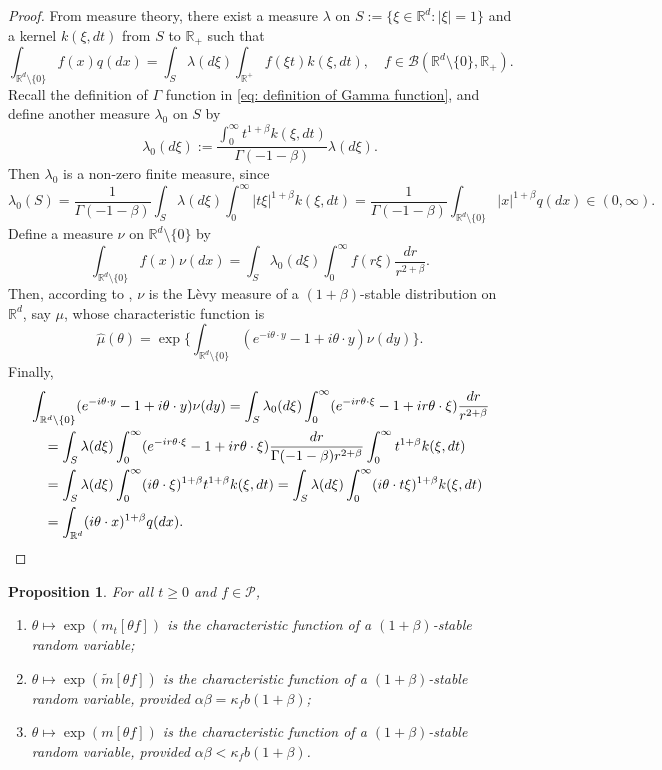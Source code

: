 \documentclass[12pt,a4paper]{amsart}
\theoremstyle{plain}
\newtheorem{prop}[thm]{Proposition}
\theoremstyle{definition}
\numberwithin{equation}{section}
\begin{document}
\begin{proof}
    From measure theory, there exist a measure $\lambda$ on $S:= \{\xi\in \mathbb R^d:|\xi| = 1\}$ and a kernel $k(\xi,dt)$ from $S$ to $\mathbb R_+$ such that
\[
    \int_{\mathbb R^d\setminus \{0\}} f(x)q(dx) = \int_S \lambda(d\xi) \int_{\mathbb R^+} f(\xi t)k(\xi,dt),\quad
    f\in \mathcal B(\mathbb R^d\setminus \{0\}, \mathbb R_+).
\]
Recall the definition of $\Gamma$ function in \eqref{eq: definition of Gamma function}, and define another measure $\lambda_0$ on $S$ by
\[
    \lambda_0(d\xi) := \frac{\int_0^\infty t^{1+\beta}k(\xi,dt)}{\Gamma(-1-\beta)} \lambda (d\xi).
\]
    Then $\lambda_0$ is a non-zero finite measure, since
\[
    \lambda_0(S) = \frac{1}{\Gamma(-1-\beta)} \int_S \lambda (d\xi) \int_0^\infty |t\xi|^{1+\beta}k(\xi,dt)
    = \frac{1}{\Gamma(-1-\beta)} \int_{\mathbb R^d\setminus\{0\}} |x|^{1+\beta} q(dx) \in (0,\infty).
\]
    Define a measure $\nu$ on $\mathbb R^d\setminus\{0\}$ by
\[
    \int_{\mathbb R^d\setminus\{0\}}f(x)\nu(dx)= \int_{S} \lambda_0(d\xi) \int_0^\infty f(r\xi) \frac{dr}{r^{2+\beta}} .
\]
    Then, according to \cite[Remark 14.4]{Sato1999Levy}, $\nu$ is the L\`evy measure of a $(1+\beta)$-stable distribution on $\mathbb R^d$, say $\mu$, whose characteristic function is \[\hat \mu(\theta)=\exp\Big\{\int_{\mathbb R^d\setminus\{0\}} (e^{-i\theta \cdot y}-1+i\theta \cdot y) \nu(dy)\Big\}.\]
	Finally,
\begin{equation}\begin{split}
    &\int_{\mathbb R^d\setminus\{0\}} (e^{-i\theta \cdot y}-1+i\theta \cdot y) \nu(dy)
    = \int_S \lambda_0(d\xi) \int_0^\infty (e^{-ir\theta \cdot \xi}-1+ir\theta \cdot \xi) \frac{dr}{r^{2+\beta}}
\\&\quad = \int_S \lambda (d\xi) \int_0^\infty (e^{-ir\theta \cdot \xi}-1+ir\theta \cdot \xi) \frac{dr}{\Gamma(-1-\beta)r^{2+\beta}}\int_0^\infty t^{1+\beta} k(\xi,dt)
\\&\quad = \int_S \lambda (d\xi) \int_0^\infty (i\theta\cdot \xi)^{1+\beta} t^{1+\beta} k(\xi,dt)
= \int_S \lambda(d\xi) \int_0^\infty (i\theta \cdot t\xi)^{1+\beta} k(\xi,dt)
\\&\quad = \int_{\mathbb R^d} (i\theta \cdot x)^{1+\beta} q(dx).
\qedhere
\end{split}\end{equation}
\end{proof}
\begin{prop}
\label{cor: alpha stable rv}
	For all $t\geq 0$ and $f\in \mathcal P$,
\begin{enumerate}
\item
\label{it: first stable}
    $\theta \mapsto \exp(m_t[\theta f])$ is the characteristic function of a $(1+\beta)$-stable random variable;
\item
\label{it: second stable}
    $\theta \mapsto \exp(\tilde m[\theta f])$ is the characteristic function of a $(1+\beta)$-stable random variable, provided $\alpha\beta=\kappa_f b(1+\beta)$;
\item
\label{it: third stable}
    $\theta \mapsto \exp(m[\theta f])$ is the characteristic function of a $(1+\beta)$-stable random variable, provided $\alpha\beta < \kappa_f b(1+\beta)$.
\end{enumerate}
\end{prop}
\end{document}
